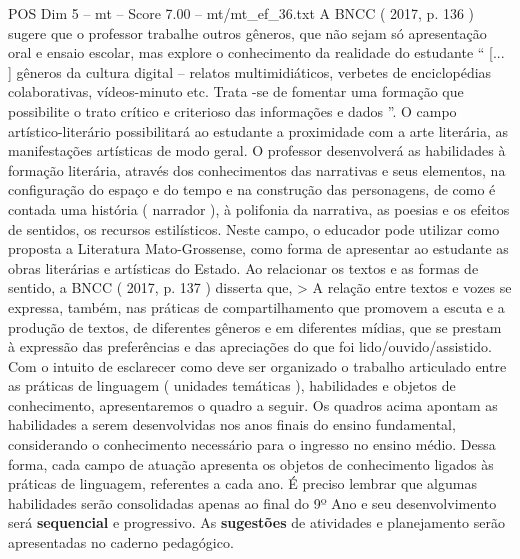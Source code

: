 \begin{textsample}{POS Dim 5 – mt – Score 7.00 – mt/mt\_ef\_36.txt}
A BNCC ( 2017, p. 136 ) sugere que o professor trabalhe outros gêneros, que não sejam só apresentação oral e ensaio escolar, mas explore o conhecimento da realidade do estudante “ [... ] gêneros da cultura digital – relatos multimidiáticos, verbetes de enciclopédias colaborativas, vídeos-minuto etc.
Trata -se de fomentar uma formação que possibilite o trato crítico e criterioso das informações e dados ”.
O campo artístico-literário possibilitará ao estudante a proximidade com a arte literária, as manifestações artísticas de modo geral.
O professor desenvolverá as habilidades à formação literária, através dos conhecimentos das narrativas e seus elementos, na configuração do espaço e do tempo e na construção das personagens, de como é contada uma história ( narrador ), à polifonia da narrativa, as poesias e os efeitos de sentidos, os recursos estilísticos.
Neste campo, o educador pode utilizar como proposta a Literatura Mato-Grossense, como forma de apresentar ao estudante as obras literárias e artísticas do Estado.
Ao relacionar os textos e as formas de sentido, a BNCC ( 2017, p. 137 ) disserta que, > A relação entre textos e vozes se expressa, também, nas práticas de compartilhamento que promovem a escuta e a produção de textos, de diferentes gêneros e em diferentes mídias, que se prestam à expressão das preferências e das apreciações do que foi lido/ouvido/assistido.
Com o intuito de esclarecer como deve ser organizado o trabalho articulado entre as práticas de linguagem ( unidades temáticas ), habilidades e objetos de conhecimento, apresentaremos o quadro a seguir.
Os quadros acima apontam as habilidades a serem desenvolvidas nos anos finais do ensino fundamental, considerando o conhecimento necessário para o ingresso no ensino médio.
Dessa forma, cada campo de atuação apresenta os objetos de conhecimento ligados às práticas de linguagem, referentes a cada ano.
É preciso lembrar que algumas habilidades serão consolidadas apenas ao final do 9º Ano e seu desenvolvimento será \textbf{sequencial} e progressivo.
As \textbf{sugestões} de atividades e planejamento serão apresentadas no caderno pedagógico.

\end{textsample}

